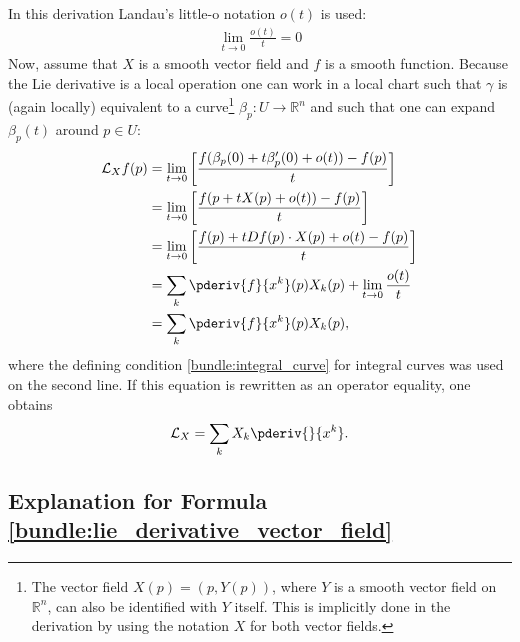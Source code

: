     In this derivation Landau's little-o notation $o(t)$ is used:
    \begin{gather}
        \lim_{t\rightarrow0}\frac{o(t)}{t} = 0
    \end{gather}
    Now, assume that $X$ is a smooth vector field and $f$ is a smooth function. Because the Lie derivative is a local operation one can work in a local chart such that $\gamma$ is (again locally) equivalent to a curve\footnote{The vector field $X(p) = (p,Y(p))$, where $Y$ is a smooth vector field on $\mathbb{R}^n$, can also be identified with $Y$ itself. This is implicitly done in the derivation by using the notation $X$ for both vector fields.} $\beta_p:U\rightarrow\mathbb{R}^n$ and such that one can expand $\beta_p(t)$ around $p\in U$:
    \begin{align}
        \mathcal{L}_Xf(p) &= \lim_{t\rightarrow0}\left[\frac{f(\beta_p(0) + t\beta_p'(0) + o(t)) - f(p)}{t}\right]\nonumber\\
        &= \lim_{t\rightarrow0}\left[\frac{f(p + tX(p) + o(t)) - f(p)}{t}\right]\nonumber\\
        &= \lim_{t\rightarrow0}\left[\frac{f(p) + tDf(p)\cdot X(p) + o(t) - f(p)}{t}\right]\nonumber\\
        &= \sum_k\pderiv{f}{x^k}(p)X_k(p) + \lim_{t\rightarrow0}\frac{o(t)}{t}\nonumber\\
        &= \sum_k\pderiv{f}{x^k}(p)X_k(p),\label{diff:lie_derivative_calc}
    \end{align}
    where the defining condition \ref{bundle:integral_curve} for integral curves was used on the second line. If this equation is rewritten as an operator equality, one obtains
    \begin{gather}
        \mathcal{L}_X = \sum_kX_k\pderiv{}{x^k}.
    \end{gather}

\subsection{Explanation for Formula \ref{bundle:lie_derivative_vector_field}}

